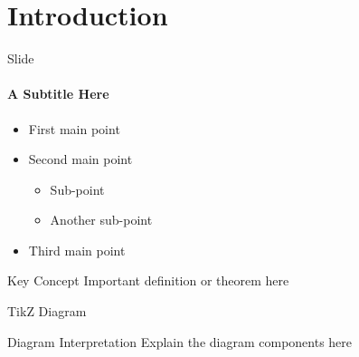 \documentclass{beamer}
\begin{document}
\begin{frame}
    \titlepage
\end{frame}

\section{Introduction}

\begin{frame}{Slide}
    \framesubtitle{A Subtitle Here}

    \begin{itemize}
        \item First main point
        \item Second main point
              \begin{itemize}
                  \item Sub-point
                  \item Another sub-point
              \end{itemize}
        \item Third main point
    \end{itemize}

    \begin{block}{Key Concept}
        Important definition or theorem here
    \end{block}
\end{frame}

\begin{frame}{TikZ Diagram}
    \begin{center}
    \end{center}

    \begin{alertblock}{Diagram Interpretation}
        Explain the diagram components here
    \end{alertblock}
\end{frame}
\end{document}
